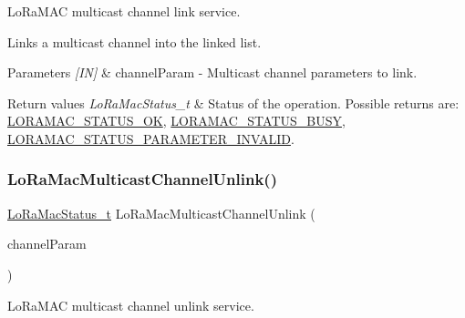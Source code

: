 Lo\+Ra\+M\+AC multicast channel link service. 

Links a multicast channel into the linked list.


\begin{DoxyParams}{Parameters}
{\em \mbox{[}\+I\+N\mbox{]}} & channel\+Param -\/ Multicast channel parameters to link.\\
\hline
\end{DoxyParams}

\begin{DoxyRetVals}{Return values}
{\em Lo\+Ra\+Mac\+Status\+\_\+t} & Status of the operation. Possible returns are\+: \hyperlink{group__LORAMAC_gga1d18f26b344040b3ec5c3db662919661a03db5fca052313edb3823c014b653a74}{L\+O\+R\+A\+M\+A\+C\+\_\+\+S\+T\+A\+T\+U\+S\+\_\+\+OK}, \hyperlink{group__LORAMAC_gga1d18f26b344040b3ec5c3db662919661a66b12f569207eacd97ee1c1d6c4cee6d}{L\+O\+R\+A\+M\+A\+C\+\_\+\+S\+T\+A\+T\+U\+S\+\_\+\+B\+U\+SY}, \hyperlink{group__LORAMAC_gga1d18f26b344040b3ec5c3db662919661ad0d3119f247d00e1787dda106fcb3017}{L\+O\+R\+A\+M\+A\+C\+\_\+\+S\+T\+A\+T\+U\+S\+\_\+\+P\+A\+R\+A\+M\+E\+T\+E\+R\+\_\+\+I\+N\+V\+A\+L\+ID}. \\
\hline
\end{DoxyRetVals}
\mbox{\label{group__LORAMAC_ga1542a215938fcff1d665ae48b449335e}} 
\subsubsection{\texorpdfstring{Lo\+Ra\+Mac\+Multicast\+Channel\+Unlink()}{LoRaMacMulticastChannelUnlink()}}
{\footnotesize\ttfamily \hyperlink{group__LORAMAC_ga30bd25657e10480f8605ee951b0ecfbd}{Lo\+Ra\+Mac\+Status\+\_\+t} Lo\+Ra\+Mac\+Multicast\+Channel\+Unlink (\begin{DoxyParamCaption}\item[{\hyperlink{group__LORAMAC_ga02d2523505cac70954c043074087ea65}{Multicast\+Params\+\_\+t} $\ast$}]{channel\+Param }\end{DoxyParamCaption})}



Lo\+Ra\+M\+AC multicast channel unlink service. 

